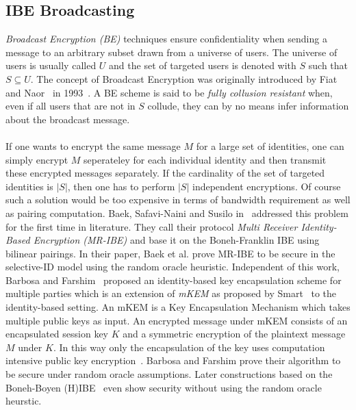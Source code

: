 \documentclass[journal]{IEEEtran}
\begin{document}
\subsection{IBE Broadcasting}
\textit{Broadcast Encryption (BE)} techniques ensure confidentiality when
sending a message to an arbitrary subset drawn from a universe of users. The
universe of users is usually called $U$ and the set of targeted users is
denoted with $S$ such that $S \subseteq U$. The concept of Broadcast Encryption
was originally introduced by Fiat and Naor~\cite{FiatBE} in
1993~\cite{LibertANOBE}. A BE scheme is said to be \textit{fully collusion
resistant} when, even if all users that are not in $S$ collude, they can by no
means infer information about the broadcast message.~\cite{DelerableeIBBE} \\
\\
If one wants to encrypt the same message $M$ for a large set of identities, one
can simply encrypt $M$ seperateley for each individual identity and then
transmit these encrypted messages separately. If the cardinality of the set of
targeted identities is $|S|$, then one has to perform $|S|$ independent
encryptions. Of course such a solution would be too expensive in terms of
bandwidth requirement as well as pairing computation. Baek, Safavi-Naini and
Susilo in~\cite{BaekIBEandBE} addressed this problem for the first time in
literature. They call their protocol \textit{Multi Receiver Identity-Based
Encryption (MR-IBE)} and base it on the Boneh-Franklin IBE using bilinear
pairings. In their paper, Baek et al. prove MR-IBE to be secure in the
selective-ID model using the random oracle heuristic. Independent of this work,
Barbosa and Farshim~\cite{BarbosaIBEKEM} proposed an identity-based key
encapsulation scheme for multiple parties which is an extension of \textit{mKEM}
as proposed by Smart~\cite{SmartMKEM} to the identity-based
setting. An mKEM is a Key Encapsulation Mechanism which takes multiple public
keys as input. An encrypted message under mKEM consists of an encapsulated
session key $K$ and a symmetric encryption of the plaintext message $M$ under
$K$. In this way only the encapsulation of the key uses computation intensive
public key encryption~\cite{SmartMKEM}. Barbosa and Farshim prove their
algorithm to be secure under random oracle assumptions. Later
constructions based on the Boneh-Boyen (H)IBE~\cite{ChatterjeeHIBE} even show
security without using the random oracle heurstic.
~\cite{ChatterjeeShortenedCiphertext}\\
\\
\end{document}
